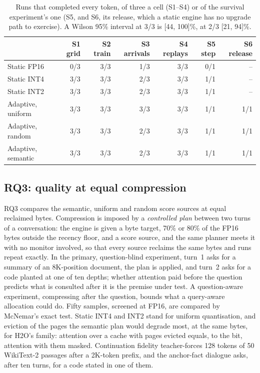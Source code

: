 \documentclass{article}
\begin{document}
\begin{table}[t]
\caption{Runs that completed every token, of three a cell (S1--S4) or of the
survival experiment's one (S5, and S6, its release, which a static engine has
no upgrade path to exercise). A Wilson 95\% interval at 3/3 is [44, 100]\%,
at 2/3 [21, 94]\%.}
\label{tab:matrix}
\centering
\small
\begin{tabular}{lrrrrrr}
\toprule
& S1 grid & S2 train & S3 arrivals & S4 replays & S5 step & S6 release \\
\midrule
Static FP16 & 0/3 & 3/3 & 1/3 & 3/3 & 0/1 & -- \\
Static INT4 & 3/3 & 3/3 & 2/3 & 3/3 & 1/1 & -- \\
Static INT2 & 3/3 & 3/3 & 2/3 & 3/3 & 1/1 & -- \\
Adaptive, uniform & 3/3 & 3/3 & 3/3 & 3/3 & 1/1 & 1/1 \\
Adaptive, random & 3/3 & 3/3 & 2/3 & 3/3 & 1/1 & 1/1 \\
Adaptive, semantic & 3/3 & 3/3 & 2/3 & 3/3 & 1/1 & 1/1 \\
\bottomrule
\end{tabular}
\end{table}

\subsection{RQ3: quality at equal compression}
\label{sec:rq3}

RQ3 compares the semantic, uniform and random score sources at equal reclaimed
bytes. Compression is imposed by a \textit{controlled plan} between two turns of
a conversation: the engine is given a byte target, 70\% or 80\% of the FP16
bytes outside the recency floor, and a score source, and the same planner meets
it with no monitor involved, so that every source reclaims the same bytes and
runs repeat exactly. In the primary, question-blind experiment, turn~1 asks for
a summary of an 8K-position document, the plan is applied, and turn~2 asks for a
code planted at one of ten depths; whether attention paid before the question
predicts what is consulted after it is the premise under test. A
question-aware experiment, compressing after the question, bounds what a
query-aware allocation could do. Fifty samples, screened at FP16, are compared
by McNemar's exact test. Static INT4 and INT2 stand for uniform quantisation,
and eviction of the pages the semantic plan would degrade most, at the same
bytes, for H2O's family: attention over a cache with pages evicted equals, to
the bit, attention with them masked. Continuation fidelity teacher-forces 128
tokens of 50 WikiText-2 passages after a 2K-token prefix, and the anchor-fact
dialogue asks, after ten turns, for a code stated in one of them.
\end{document}
